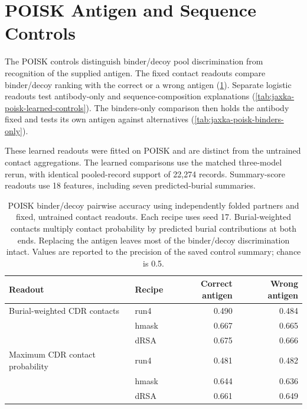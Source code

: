 \section{POISK Antigen and Sequence Controls}
\label{app:jaxka-poisk-controls}

The POISK controls distinguish binder/decoy pool discrimination from recognition of the supplied antigen. The fixed contact readouts compare binder/decoy ranking with the correct or a wrong antigen (\cref{tab:jaxka-poisk-wrong-antigen}). Separate logistic readouts test antibody-only and sequence-composition explanations (\cref{tab:jaxka-poisk-learned-controls}). The binders-only comparison then holds the antibody fixed and tests its own antigen against alternatives (\cref{tab:jaxka-poisk-binders-only}).

These learned readouts were fitted on POISK and are distinct from the untrained contact aggregations. The learned comparisons use the matched three-model rerun, with identical pooled-record support of 22,274 records. Summary-score readouts use 18 features, including seven predicted-burial summaries.

\begin{table}[htbp]
    \centering
    \small
    \begin{tabular}{llrr}
        \toprule
        Readout & Recipe & Correct antigen & Wrong antigen \\
        \midrule
        Burial-weighted CDR contacts & run4 & 0.490 & 0.484 \\
         & hmask & 0.667 & 0.665 \\
         & dRSA & 0.675 & 0.666 \\
        Maximum CDR contact probability & run4 & 0.481 & 0.482 \\
         & hmask & 0.644 & 0.636 \\
         & dRSA & 0.661 & 0.649 \\
        \bottomrule
    \end{tabular}
    \caption[POISK correct- and wrong-antigen controls]{POISK binder/decoy pairwise accuracy using independently folded partners and fixed, untrained contact readouts. Each recipe uses seed 17. Burial-weighted contacts multiply contact probability by predicted burial contributions at both ends. Replacing the antigen leaves most of the binder/decoy discrimination intact. Values are reported to the precision of the saved control summary; chance is 0.5.}
    \label{tab:jaxka-poisk-wrong-antigen}
\end{table}

